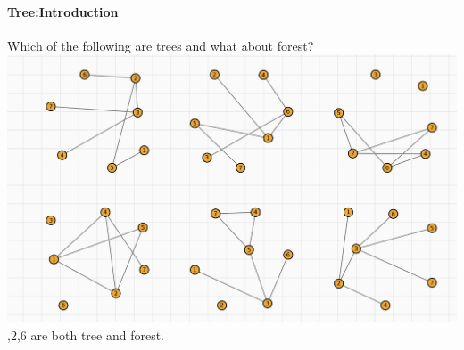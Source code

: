 \documentclass{article}
\begin{document}
\paragraph{Tree:Introduction}
Which of the following are trees and what about forest?\newline
\includegraphics{0055},2,6 are both tree and forest.\newline
\end{document}
